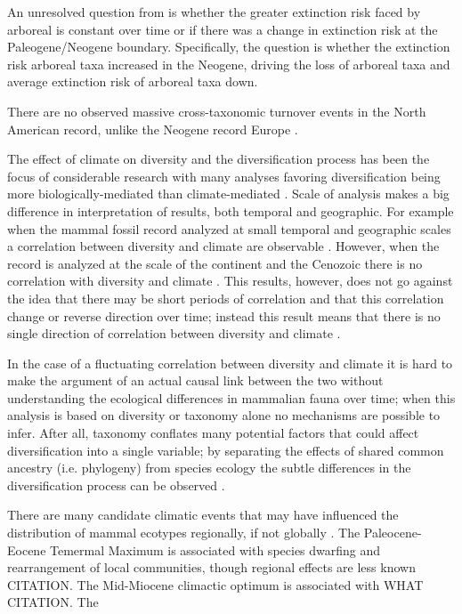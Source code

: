 \documentclass[12pt,letterpaper]{article}
\begin{document}
An unresolved question from \citet{Smits2015b} is whether the greater extinction risk faced by arboreal is constant over time or if there was a change in extinction risk at the Paleogene/Neogene boundary. Specifically, the question is whether the extinction risk arboreal taxa increased in the Neogene, driving the loss of arboreal taxa and average extinction risk of arboreal taxa down. 

There are no observed massive cross-taxonomic turnover events in the North American record, unlike the Neogene record Europe \citep{Alroy2009,Alroy1996a,Eronen2015,Janis1993a,Alroy2000g}.

The effect of climate on diversity and the diversification process has been the focus of considerable research with many analyses favoring diversification being more biologically-mediated than climate-mediated \citep{Alroy1996a,Alroy2000g,Figueirido2012,Clyde1998a}. Scale of analysis makes a big difference in interpretation of results, both temporal and geographic. For example when the mammal fossil record analyzed at small temporal and geographic scales a correlation between diversity and climate are observable \citep{Clyde1998a}. However, when the record is analyzed at the scale of the continent and the Cenozoic there is no correlation with diversity and climate \citep{Alroy2000g}. This results, however, does not go against the idea that there may be short periods of correlation and that this correlation change or reverse direction over time; instead this result means that there is no single direction of correlation between diversity and climate \citep{Figueirido2012}. 

In the case of a fluctuating correlation between diversity and climate it is hard to make the argument of an actual causal link between the two without understanding the ecological differences in mammalian fauna over time; when this analysis is based on diversity or taxonomy alone no mechanisms are possible to infer. After all, taxonomy conflates many potential factors that could affect diversification into a single variable; by separating the effects of shared common ancestry (i.e. phylogeny) from species ecology the subtle differences in the diversification process can be observed \citep{Smits2015b}.

There are many candidate climatic events that may have influenced the distribution of mammal ecotypes regionally, if not globally \citep{Zachos2001,Zachos2008,Janis1993a,Blois2009}. The Paleocene-Eocene Temermal Maximum is associated with species dwarfing and rearrangement of local communities, though regional effects are less known CITATION. The Mid-Miocene climactic optimum is associated with WHAT CITATION. The 
\end{document}
